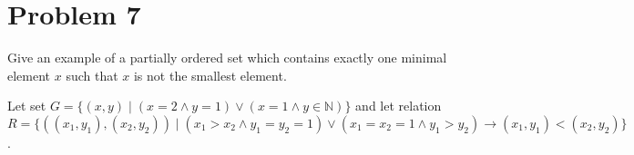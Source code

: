 \documentclass{article}
\begin{document}

    \section*{Problem 7}

    Give an example of a partially ordered set which contains exactly one minimal element 
    $x$ such that $x$ is not the smallest element.

    Let set $G=\{(x,y)\;|\; (x=2 \land y=1) \lor (x=1 \land y\in\mathbb{N})\}$ and let relation 
    $R=\{((x_1,y_1),(x_2,y_2))\;|\; (x_1>x_2\land y_1=y_2=1)\lor (x_1=x_2=1\land y_1>y_2)\rightarrow (x_1,y_1) < (x_2,y_2)\}$.
\end{document}
